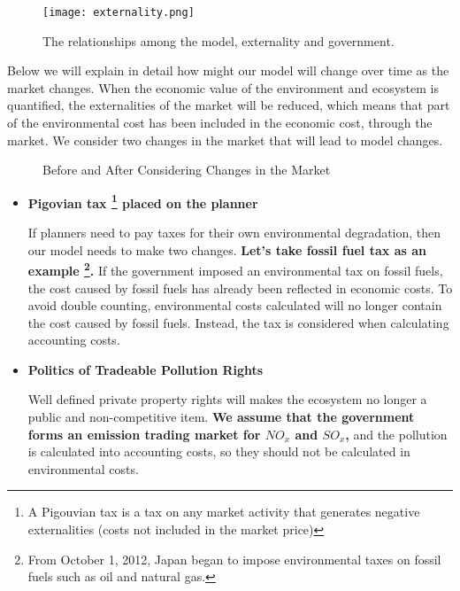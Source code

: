 \documentclass{mcmthesis}
\begin{document}
		\begin{figure}[h]
			\small
			\centering
			\texttt{[image: externality.png]}
			\caption{The relationships among the model, externality and government.}
			\label{fig:externality}
		\end{figure}
		
		Below we will explain in detail how might our model will change over time as the market changes. When the economic value of the environment and ecosystem is quantified, the externalities of the market will be reduced, which means that part of the environmental cost has been included in the economic cost, through the market. We consider two changes in the market that will lead to model changes.
		
		\begin{figure}[htbp]
			\centering
			\centering
			\caption{Before and After Considering Changes in the Market}
		\end{figure}
		
		\begin{itemize}
			
			\item \textbf{Pigovian tax \footnote{A Pigouvian tax is a tax on any market activity that generates negative externalities (costs not included in the market price)} placed on the planner}
			
			If planners need to pay taxes for their own environmental degradation, then our model needs to make two changes. \textbf{Let's take fossil fuel tax as an example \footnote{From October 1, 2012, Japan began to impose environmental taxes on fossil fuels such as oil and natural gas.}.} If the government imposed an environmental tax on fossil fuels, the cost caused by fossil fuels has already been reflected in economic costs. To avoid double counting, environmental costs calculated will no longer contain the cost caused by fossil fuels. Instead, the tax is considered when calculating accounting costs.
			
			\item \textbf{Politics of Tradeable Pollution Rights}
			
			Well defined private property rights will makes the  ecosystem no longer a public and non-competitive item. \textbf{We assume that the government forms an emission trading market for $NO_x$ and $SO_x$,} and the pollution is calculated into accounting costs, so they should not be calculated in environmental costs.
			
		\end{itemize}
	
\end{document}
